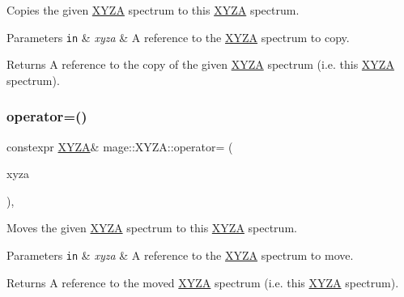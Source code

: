 Copies the given \mbox{\hyperlink{structmage_1_1_x_y_z_a}{X\+Y\+ZA}} spectrum to this \mbox{\hyperlink{structmage_1_1_x_y_z_a}{X\+Y\+ZA}} spectrum.


\begin{DoxyParams}[1]{Parameters}
\mbox{\tt in}  & {\em xyza} & A reference to the \mbox{\hyperlink{structmage_1_1_x_y_z_a}{X\+Y\+ZA}} spectrum to copy. \\
\hline
\end{DoxyParams}
\begin{DoxyReturn}{Returns}
A reference to the copy of the given \mbox{\hyperlink{structmage_1_1_x_y_z_a}{X\+Y\+ZA}} spectrum (i.\+e. this \mbox{\hyperlink{structmage_1_1_x_y_z_a}{X\+Y\+ZA}} spectrum). 
\end{DoxyReturn}
\mbox{\label{structmage_1_1_x_y_z_a_a15556bcc4521264fc3edfc1b4f1a595a}} 
\subsubsection{\texorpdfstring{operator=()}{operator=()}\hspace{0.1cm}{\footnotesize\ttfamily [2/2]}}
{\footnotesize\ttfamily constexpr \mbox{\hyperlink{structmage_1_1_x_y_z_a}{X\+Y\+ZA}}\& mage\+::\+X\+Y\+Z\+A\+::operator= (\begin{DoxyParamCaption}\item[{\mbox{\hyperlink{structmage_1_1_x_y_z_a}{X\+Y\+ZA}} \&\&}]{xyza }\end{DoxyParamCaption})\hspace{0.3cm}{\ttfamily [default]}, {\ttfamily [noexcept]}}

Moves the given \mbox{\hyperlink{structmage_1_1_x_y_z_a}{X\+Y\+ZA}} spectrum to this \mbox{\hyperlink{structmage_1_1_x_y_z_a}{X\+Y\+ZA}} spectrum.


\begin{DoxyParams}[1]{Parameters}
\mbox{\tt in}  & {\em xyza} & A reference to the \mbox{\hyperlink{structmage_1_1_x_y_z_a}{X\+Y\+ZA}} spectrum to move. \\
\hline
\end{DoxyParams}
\begin{DoxyReturn}{Returns}
A reference to the moved \mbox{\hyperlink{structmage_1_1_x_y_z_a}{X\+Y\+ZA}} spectrum (i.\+e. this \mbox{\hyperlink{structmage_1_1_x_y_z_a}{X\+Y\+ZA}} spectrum). 
\end{DoxyReturn}
\mbox{\label{structmage_1_1_x_y_z_a_abbf1fe2475252fc2fa62588de5534dee}} 

